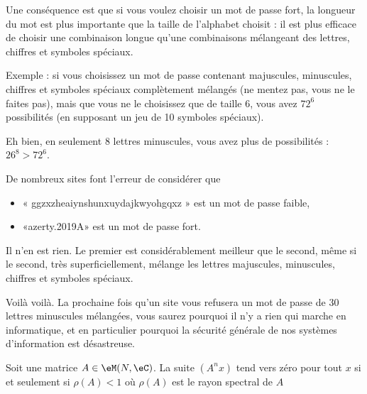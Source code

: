 \begin{normaltext}
	Une conséquence est que si vous voulez choisir un mot de passe fort, la longueur du mot est plus importante que la taille de l'alphabet choisit : il est plus efficace de choisir une combinaison longue qu'une combinaisons mélangeant des lettres, chiffres et symboles spéciaux.

	Exemple : si vous choisissez un mot de passe contenant majuscules, minuscules, chiffres et symboles spéciaux complètement mélangés (ne mentez pas, vous ne le faites pas), mais que vous ne le choisissez que de taille \( 6\), vous avez \( 72^6\) possibilités (en supposant un jeu de 10 symboles spéciaux).

	Eh bien, en seulement \( 8\) lettres minuscules, vous avez plus de possibilités : \( 26^8>72^6\).

	De nombreux sites font l'erreur de considérer que
	\begin{itemize}
		\item « ggzxzheaiynshunxuydajkwyohgqxz » est un mot de passe faible,
		\item «azerty.2019A» est un mot de passe fort.
	\end{itemize}
	Il n'en est rien. Le premier est considérablement meilleur que le second, même si le second, très superficiellement, mélange les lettres majuscules, minuscules, chiffres et symboles spéciaux.

	Voilà voilà. La prochaine fois qu'un site vous refusera un mot de passe de 30 lettres minuscules mélangées, vous saurez pourquoi il n'y a rien qui marche en informatique, et en particulier pourquoi la sécurité générale de nos systèmes d'information est désastreuse.
\end{normaltext}

\begin{theorem}     \label{THOooHWNWooTewPvt}
	Soit une matrice \( A\in \eM(N,\eC)\). La suite \( (A^nx)\) tend vers zéro pour tout \( x\) si et seulement si \( \rho(A)<1\) où \( \rho(A)\) est le rayon spectral de \( A\)
\end{theorem}

